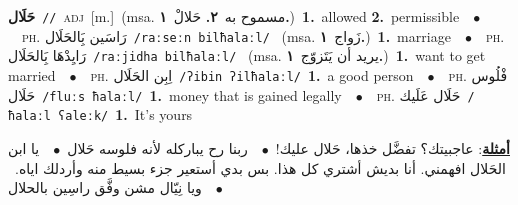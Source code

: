 \documentclass[10pt,a4paper,twoside]{article} %
\begin{document}
\begin{multicols}{2}
{\setlength\topsep{0pt}\textbf{\foreignlanguage{arabic}{حَلَال}}\ {\color{gray}\texttt{//}\color{black}}\ \textsc{adj}\ [m.]\ \color{gray}(msa. \foreignlanguage{arabic}{مسموح به}~\foreignlanguage{arabic}{\textbf{٢.}}  \foreignlanguage{arabic}{حَلالْ}~\foreignlanguage{arabic}{\textbf{١.}})\color{black}\ \textbf{1.}~allowed  \textbf{2.}~permissible\ \ $\bullet$\ \ \textsc{ph.} \color{gray} \foreignlanguage{arabic}{رَاسَين بَِالحَلَال}\color{black}\ {\color{gray}\texttt{/{\sffamily raːseːn bilħalaːl}/}\color{black}}\ \color{gray} (msa. \foreignlanguage{arabic}{زَواج}~\foreignlanguage{arabic}{\textbf{١.}})\color{black}\ \textbf{1.}~marriage\ \ $\bullet$\ \ \textsc{ph.} \color{gray} \foreignlanguage{arabic}{رَايِدْهَا بَِالحَلَال}\color{black}\ {\color{gray}\texttt{/{\sffamily raːjidha bilħalaːl}/}\color{black}}\ \color{gray} (msa. \foreignlanguage{arabic}{يريد أن يَتَزوّج}~\foreignlanguage{arabic}{\textbf{١.}})\color{black}\ \textbf{1.}~want to get married\ \ $\bullet$\ \ \textsc{ph.} \color{gray} \foreignlanguage{arabic}{اِبِن الحَلَال}\color{black}\ {\color{gray}\texttt{/{\sffamily ʔibin ʔilħalaːl}/}\color{black}}\ \textbf{1.}~a good person\ \ $\bullet$\ \ \textsc{ph.} \color{gray} \foreignlanguage{arabic}{فْلُوس حَلَال}\color{black}\ {\color{gray}\texttt{/{\sffamily fluːs ħalaːl}/}\color{black}}\ \textbf{1.}~money that is gained legally\ \ $\bullet$\ \ \textsc{ph.} \color{gray} \foreignlanguage{arabic}{حَلَال عَلَيك}\color{black}\ {\color{gray}\texttt{/{\sffamily ħalaːl ʕaleːk}/}\color{black}}\ \textbf{1.}~It's yours\  \begin{flushright}\color{gray}\foreignlanguage{arabic}{\textbf{\underline{\foreignlanguage{arabic}{أمثلة}}}: عاجبيتك؟ تفضَّل خذها، حَلال عليك!\ $\bullet$\ \  ربنا رح يباركله لأنه فلوسه حَلال\ $\bullet$\ \  يا ابن الحَلال افهمني. أنا بديش أشتري كل هذا. بس بدي أستعير جزء بسيط منه وأردلك اياه.\ $\bullet$\ \  ويا نِيّال مشن وفَّق راسِين بالحلال}\end{flushright}\color{black}} \vspace{2mm}


\end{multicols}
\end{document}
